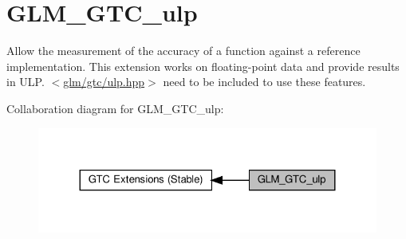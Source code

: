 \hypertarget{group__gtc__ulp}{}\section{G\+L\+M\+\_\+\+G\+T\+C\+\_\+ulp}
\label{group__gtc__ulp}


Allow the measurement of the accuracy of a function against a reference implementation. This extension works on floating-\/point data and provide results in U\+LP. $<$\hyperlink{gtc_2ulp_8hpp}{glm/gtc/ulp.\+hpp}$>$ need to be included to use these features.  


Collaboration diagram for G\+L\+M\+\_\+\+G\+T\+C\+\_\+ulp\+:\nopagebreak
\begin{figure}[H]
\begin{center}
\leavevmode
\includegraphics[width=324pt]{group__gtc__ulp}
\end{center}
\end{figure}
